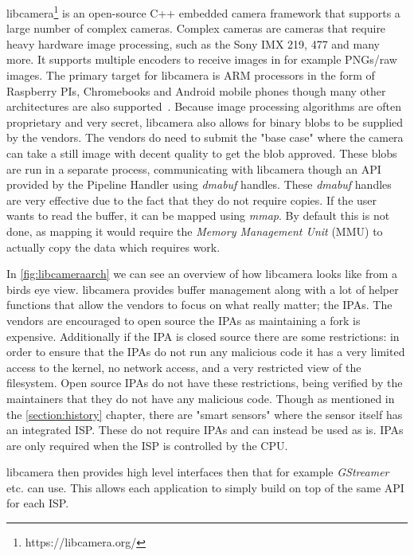 libcamera\footnote{https://libcamera.org/} is an open-source C++ embedded camera framework that supports a large
number of complex cameras. Complex cameras are cameras that require heavy
hardware image processing, such as the Sony IMX 219, 477 and many more. It
supports multiple encoders to receive images in for example PNGs/raw images.
The primary target for libcamera is ARM processors in the form of Raspberry
PIs, Chromebooks and Android mobile phones though many other architectures are
also supported~\cite{libcameraStack}. Because image processing algorithms are
often proprietary and very secret, libcamera also allows for binary blobs to be
supplied by the vendors. The vendors do need to submit the "base case" where
the camera can take a still image with decent quality to get the blob approved.
These blobs are run in a separate process, communicating with libcamera though
an API provided by the Pipeline Handler using \textit{dmabuf} handles. These
\textit{dmabuf} handles are very effective due to the fact that they do not
require copies. If the user wants to read the buffer, it can be mapped using
\textit{mmap}. By default this is not done, as mapping it would require the
\textit{Memory Management Unit} (MMU) to actually copy the data which requires
work.

In \cref{fig:libcameraarch} we can see an overview of how libcamera looks like
from a birds eye view. libcamera provides buffer management along with a lot of
helper functions that allow the vendors to focus on what really matter; the
IPAs. The vendors are encouraged to open source the IPAs as maintaining a fork
is expensive. Additionally if the IPA is closed source there are some
restrictions: in order to ensure that the IPAs do not run any malicious code it
has a very limited access to the kernel, no network access, and a very
restricted view of the filesystem. Open source IPAs do not have these
restrictions, being verified by the maintainers that they do not have any
malicious code. Though as mentioned in the \cref{section:history} chapter,
there are "smart sensors" where the sensor itself has an integrated ISP. These
do not require IPAs and can instead be used as is. IPAs are only required when
the ISP is controlled by the CPU\cite{libcameraStack}.

libcamera then provides high level interfaces then that for example
\textit{GStreamer} etc. can use. This allows each application to simply build on top
of the same API for each ISP.


